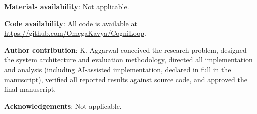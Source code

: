 \documentclass[11pt]{article}
\begin{document}
\vspace{0.5em}
\noindent
\textbf{Materials availability}: Not applicable.

\vspace{0.5em}
\noindent
\textbf{Code availability}: All code is available at \url{https://github.com/OmegaKavya/CogniLoop}.

\vspace{0.5em}
\noindent
\textbf{Author contribution}: K. Aggarwal conceived the research problem, designed the system architecture and evaluation methodology, directed all implementation and analysis (including AI-assisted implementation, declared in full in the manuscript), verified all reported results against source code, and approved the final manuscript.

\vspace{0.5em}
\noindent
\textbf{Acknowledgements}: Not applicable.
\end{document}
